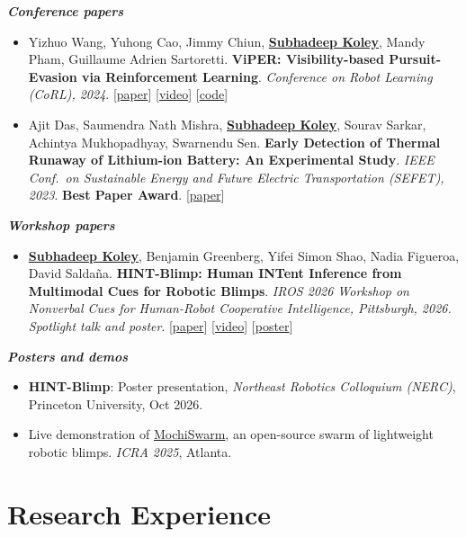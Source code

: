 \documentclass[11pt,letterpaper]{article}
\newcommand{\pub}[4]{%
  \item #1. \textbf{\color{black}#2}. \textit{#3}. #4}
\newcommand{\me}{\textbf{\underline{Subhadeep Koley}}}
\newcommand{\subhead}[1]{\vspace{3pt}\textit{\textbf{#1}}\par}
\begin{document}
\subhead{Conference papers}
\begin{itemize}
  \pub{Yizhuo Wang, Yuhong Cao, Jimmy Chiun, \me, Mandy Pham, Guillaume Adrien Sartoretti}
      {ViPER: Visibility-based Pursuit-Evasion via Reinforcement Learning}
      {Conference on Robot Learning (CoRL), 2024}
      {[\href{https://openreview.net/forum?id=EPujQZWemk}{paper}] [\href{https://www.youtube.com/watch?v=r2SurmnPKuA}{video}] [\href{https://github.com/marmotlab/ViPER}{code}]}
  \pub{Ajit Das, Saumendra Nath Mishra, \me, Sourav Sarkar, Achintya Mukhopadhyay, Swarnendu Sen}
      {Early Detection of Thermal Runaway of Lithium-ion Battery: An Experimental Study}
      {IEEE Conf.\ on Sustainable Energy and Future Electric Transportation (SEFET), 2023}
      {\textbf{Best Paper Award}. [\href{https://doi.org/10.1109/SEFET57834.2023.10245991}{paper}]}
\end{itemize}

\subhead{Workshop papers}
\begin{itemize}
  \pub{\me, Benjamin Greenberg, Yifei Simon Shao, Nadia Figueroa, David Salda\~na}
      {HINT-Blimp: Human INTent Inference from Multimodal Cues for Robotic Blimps}
      {IROS 2026 Workshop on Nonverbal Cues for Human-Robot Cooperative Intelligence, Pittsburgh, 2026.
       Spotlight talk and poster}
      {[\href{https://nocworkshop.github.io/2026-IROS/resources/15/Camera_ready_HintBlimp_IROS_NoC_workshop.pdf}{paper}]
       [\href{https://www.youtube.com/watch?v=P_ZU_f_-qek}{video}]
       [\href{https://nocworkshop.github.io/2026-IROS/resources/15/IROS_workshop_poster.pdf}{poster}]}
\end{itemize}

\subhead{Posters and demos}
\begin{itemize}
  \item \textbf{\color{black}HINT-Blimp}: Poster presentation, \textit{Northeast Robotics Colloquium (NERC)},
        Princeton University, Oct 2026.
  \item Live demonstration of \href{https://ieeexplore.ieee.org/document/11127424}{MochiSwarm}, an open-source swarm of lightweight robotic blimps. \textit{ICRA 2025}, Atlanta.
\end{itemize}

\section{Research Experience}
\end{document}
